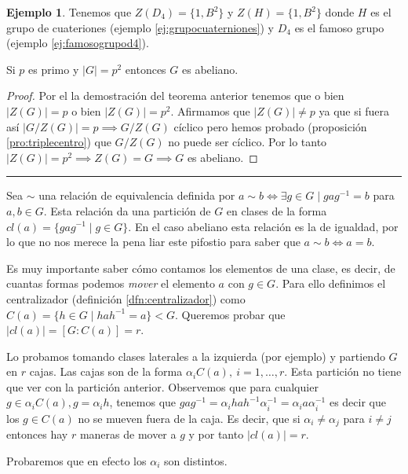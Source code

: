 \documentclass{book}
\theoremstyle{definition}
\newtheorem{ej}{Ejemplo}
\theoremstyle{remark}
\newcommand{\inv}[1]{#1^{-1}}
\newcommand{\hr}{\rule{\textwidth}{.4pt}}
\begin{document}
\begin{ej}
	Tenemos que $Z(D_4) = \{1,B^2\}$ y $Z(H) = \{1, B^2\}$ donde $H$ es el grupo de cuateriones (ejemplo \ref{ej:grupocuaterniones}) y $D_4$ es el famoso grupo (ejemplo \ref{ej:famosogrupod4}). 
\end{ej}

\begin{thm}
	Si $p$ es primo y $|G| = p^2$ entonces $G$ es abeliano.
\end{thm}

\begin{proof}
	Por el la demostración del teorema anterior tenemos que o bien $|Z(G)| = p$ o bien $|Z(G)| = p^2$. Afirmamos que $|Z(G)| \neq p$ ya que si fuera así $|G/Z(G)| = p \implies G/Z(G)$ cíclico pero hemos probado (proposición \ref{pro:triplecentro}) que $G/Z(G)$ no puede ser cíclico. Por lo tanto $|Z(G)| = p^2 \implies Z(G) = G \implies G$ es abeliano.
\end{proof}


\hr

Sea $\sim$ una relación de equivalencia definida por $a\sim b \iff \exists g \in G \mid ga\inv{g} = b$ para $a,b \in G$. Esta relación da una partición de $G$ en clases de la forma $cl(a) = \{ga\inv{g} \mid g \in G\}$. En el caso abeliano esta relación es la de igualdad, por lo que no nos merece la pena liar este pifostio para saber que $a\sim b \iff a = b$. 

Es muy importante saber cómo contamos los elementos de una clase, es decir, de cuantas formas podemos \textit{mover} el elemento $a$ con $g \in G$. Para ello definimos el centralizador (definición \ref{dfn:centralizador}) como $C(a) = \{h \in G \mid ha\inv{h} = a\} < G$. Queremos probar que $|cl(a)| = [G:C(a)] = r$.

Lo probamos tomando clases laterales a la izquierda (por ejemplo) y partiendo $G$ en $r$ cajas. Las cajas son de la forma $\alpha_iC(a),\ i = 1, \dots, r$. Esta partición no tiene que ver con la partición anterior. Observemos que para cualquier $g \in \alpha_i C(a), g = \alpha_i h$, tenemos que $g a \inv{g} = \alpha_i h a \inv{h} \inv{\alpha_i} = \alpha_i a \inv{\alpha_i}$ es decir que los $g \in C(a)$ no se mueven fuera de la caja. Es decir, que si $\alpha_i \neq \alpha_j$ para $i\neq j$ entonces hay $r$ maneras de mover a $g$ y por tanto $|cl(a)| = r$.

Probaremos que en efecto los $\alpha_i$ son distintos.
\end{document}
